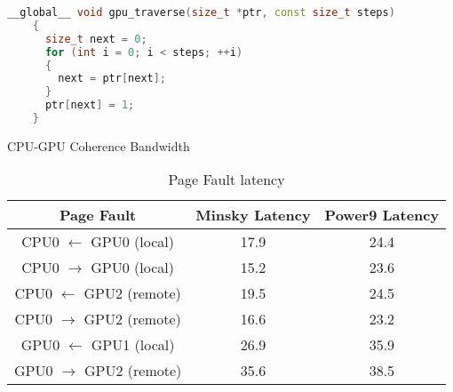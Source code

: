 \begin{lstlisting}[language=c++, caption=Linked List Traversal, label=lst:traversal]
    __global__ void gpu_traverse(size_t *ptr, const size_t steps)
    {
      size_t next = 0;
      for (int i = 0; i < steps; ++i)
      {
        next = ptr[next];
      }
      ptr[next] = 1;
    }
\end{lstlisting}

\begin{algorithm}
    \caption{CPU-GPU Coherence Bandwidth}
    \label{alg:um-coherence-bw}
    \begin{algorithmic}[1]
    \Statex

    \EndFunction

    \end{algorithmic}
\end{algorithm}


\begin{table}[h]
	\centering
	\caption[]{Page Fault latency}
	\label{tab:page-fault-latency}
	\begin{tabular}{|c|c|c|}
		\hline
		\textbf{Page Fault} & \textbf{Minsky Latency} & \textbf{Power9 Latency} \\ \hline
		CPU0 $\leftarrow$ GPU0  (local) & 17.9 & 24.4   \\ \hline
        CPU0 $\rightarrow$ GPU0 (local) & 15.2 & 23.6  \\ \hline
        CPU0 $\leftarrow$ GPU2  (remote) & 19.5 & 24.5   \\ \hline
        CPU0 $\rightarrow$ GPU2 (remote) & 16.6 & 23.2  \\ \hline
        GPU0 $\leftarrow$ GPU1  (local) & 26.9 & 35.9   \\ \hline
		GPU0 $\rightarrow$ GPU2 (remote) & 35.6 & 38.5  \\ \hline
	\end{tabular}
\end{table}


